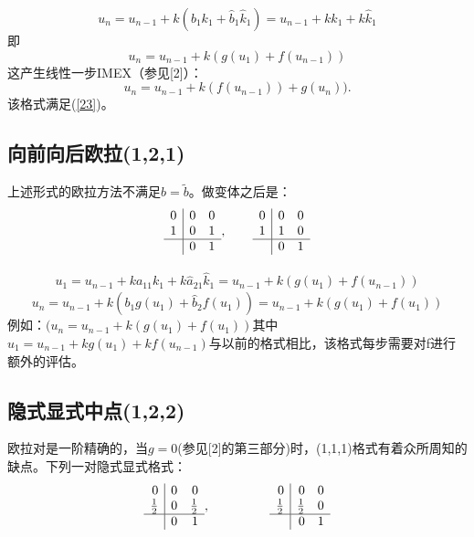 \documentclass[12pt,a4paper]{article}
\numberwithin{equation}{section}
\begin{document}
\begin{equation*}
u_{n}=u_{n-1}+k(b_{1}k_{1}+\hat{b}_{1}\hat{k}_{1})=u_{n-1}+kk_{1}+k\hat{k}_{1}
\end{equation*}
即
\begin{equation*}
u_{n}=u_{n-1}+k(g(u_{1})+f(u_{n-1}))
\end{equation*}
这产生线性一步IMEX（参见[2]）：
\begin{equation}
u_{n}=u_{n-1}+k(f(u_{n-1}))+g(u_{n})).
\end{equation}
该格式满足(\ref{23})。

\subsection{向前向后欧拉(1,2,1)}

上述形式的欧拉方法不满足$\widehat{b}=\tilde{b}$。做变体之后是：
\[
\begin{array}{r|rr}
0 & 0 & 0\\
1 & 0 & 1 \\
\hline
& 0 & 1
\end{array},~~~~~~
\begin{array}{r|rr}
0 & 0 & 0\\
1 & 1 & 0 \\
\hline
& 0 & 1
\end{array}
\]

\begin{gather}
u_{1}=u_{n-1}+ka_{11}k_{1}+k\hat{a}_{21}\hat{k}_{1}=u_{n-1}+k(g(u_{1})+f(u_{n-1}))
\end{gather}
\begin{equation*}
u_{n}=u_{n-1}+k(b_{1}g(u_{1})+\hat{b}_{2}f(u_{1}))=u_{n-1}+k(g(u_{1})+f(u_{1}))
\end{equation*}
例如：$(u_{n}=u_{n-1}+k(g(u_{1})+f(u_{1}))$其中$u_{1}=u_{n-1}+kg(u_{1})+kf(u_{n-1})$与以前的格式相比，该格式每步需要对f进行额外的评估。

\subsection{隐式显式中点(1,2,2)}
欧拉对是一阶精确的，当$g=0$(参见[2]的第三部分)时，(1,1,1)格式有着众所周知的缺点。下列一对隐式显式格式：
\[
\begin{array}{r|rr}
0 & 0 & 0\\
\frac{1}{2} & 0 & \frac{1}{2}\\
\hline
& 0 & 1
\end{array},~~~~~~~~~~~~~~
\begin{array}{r|rr}
0 & 0 & 0\\
\frac{1}{2} & \frac{1}{2} & 0\\
\hline
& 0 & 1
\end{array}
\]
\end{document}
